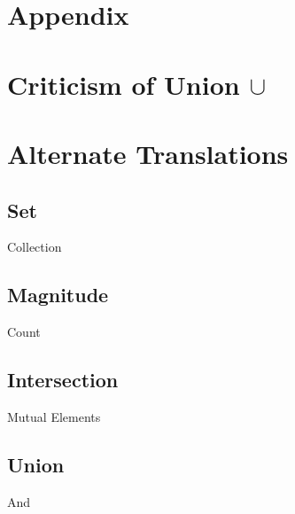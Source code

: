\documentclass[11pt]{article}
\begin{document}
\newpage
\section*{Appendix}

\section{Criticism of Union $\cup$}


\section{Alternate Translations}
\subsection{Set}
Collection
\subsection{Magnitude}
Count
\subsection{Intersection}
Mutual Elements
\subsection{Union}
And
\end{document}
